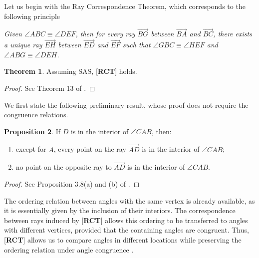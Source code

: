 \documentclass[11pt,a4paper]{article}
\theoremstyle{definition}
\newtheorem{thm}{Theorem}[section]
\newtheorem{prop}[thm]{Proposition}
\theoremstyle{remark}
\numberwithin{equation}{section}
\begin{document}
Let us begin with the Ray Correspondence Theorem, which corresponds to the following principle
\begin{enumerate}[label=\textrm{[}\textbf{RCT}\textrm{]}]
  \item\label{RCT} \emph{Given $\angle ABC \equiv \angle DEF$, then for every ray $\overrightarrow{BG}$ between $\overrightarrow{BA}$ and $\overrightarrow{BC}$, there exists a unique ray $\overrightarrow{EH}$ between $\overrightarrow{ED}$ and $\overrightarrow{EF}$ such that $\angle GBC \equiv \angle HEF$ and $\angle ABG \equiv \angle DEH$.}
\end{enumerate}
\begin{thm}\label{PEN_RCT}
  Assuming SAS, [\textbf{RCT}] holds.
\end{thm}
\begin{proof}
See Theorem 13 of \cite{Hilbert1950}.
\end{proof}
We first state the following preliminary result, whose proof does not require the congruence relations.
\begin{prop}\label{PEN_PO_08}
If $D$ is in the interior of $\angle CAB$, then:
\begin{enumerate}[label=(\roman*)]
  \item\label{PEN_PO_08_i} except for $A$, every point on the ray $\overrightarrow{AD}$ is in the interior of $\angle CAB$;
  \item no point on the opposite ray to $\overrightarrow{AD}$ is in the interior of $\angle CAB$.
\end{enumerate}
\end{prop}
\begin{proof}
See Proposition 3.8(a) and (b) of \cite{Greenberg1993}.
\end{proof}
The ordering relation between angles with the same vertex is already available, as it is essentially given by the inclusion of their interiors. The correspondence between rays induced by [\textbf{RCT}] allows this ordering to be transferred to angles with different vertices, provided that the containing angles are congruent. Thus, [\textbf{RCT}] allows us to compare angles in different locations while preserving the ordering relation under angle congruence \cite[Definition at p. 91]{Greenberg1993}.
\end{document}
